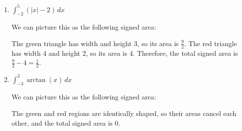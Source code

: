\documentclass{article}
\begin{document}
\begin{enumerate}
\begin{enumerate}
    \item
      \begin{problem}[\vfill] %
        $\displaystyle \int_{-2}^5 (|x| - 2) \, dx$
      \end{problem}

      \begin{solution}
        We can picture this as the following signed area:
        \begin{center}
        \end{center}                
        The green triangle has width and height 3, so its area is
        $\frac{9}{2}$.  The red triangle has width 4 and height 2, so its
        area is 4. Therefore, the total signed area is $\displaystyle
        \frac{9}{2} - 4 = \boxed{\frac{1}{2}}$.
      \end{solution}

    \item
      \begin{problem}[\vfill\newpage] %
        $\displaystyle \int_{-3}^3 \arctan(x) \, dx$
      \end{problem}

      \begin{solution}
        We can picture this as the following signed area:
        \begin{center}
        \end{center}
        The green and red regions are identically shaped, so their areas
        cancel each other, and the total signed area is $\boxed{0}$. 
      \end{solution}


\end{enumerate}
\end{enumerate}
\end{document}
